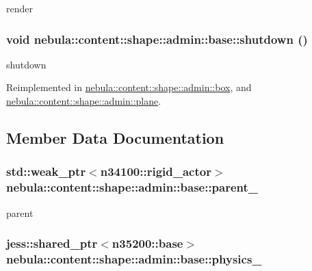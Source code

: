 render \hypertarget{classnebula_1_1content_1_1shape_1_1admin_1_1base_a61d6e9d7853ccf10ddd3d05311729f79}{
\subsubsection[{shutdown}]{\setlength{\rightskip}{0pt plus 5cm}void nebula::content::shape::admin::base::shutdown ()}}
\label{classnebula_1_1content_1_1shape_1_1admin_1_1base_a61d6e9d7853ccf10ddd3d05311729f79}


shutdown 

Reimplemented in \hyperlink{classnebula_1_1content_1_1shape_1_1admin_1_1box_a498fc0508fcdfc64a7e80141f623505d}{nebula::content::shape::admin::box}, and \hyperlink{classnebula_1_1content_1_1shape_1_1admin_1_1plane_ac713ec10355d797e07aabad0c4ebd32b}{nebula::content::shape::admin::plane}.

\subsection{Member Data Documentation}
\hypertarget{classnebula_1_1content_1_1shape_1_1admin_1_1base_a92ffa5c28e9bafe28e7442d6d94bdb04}{
\subsubsection[{parent\_\-}]{\setlength{\rightskip}{0pt plus 5cm}std::weak\_\-ptr$<${\bf n34100::rigid\_\-actor}$>$ {\bf nebula::content::shape::admin::base::parent\_\-}}}
\label{classnebula_1_1content_1_1shape_1_1admin_1_1base_a92ffa5c28e9bafe28e7442d6d94bdb04}


parent \hypertarget{classnebula_1_1content_1_1shape_1_1admin_1_1base_aae0ba5dbb2a6c2750589fe51d3b781a5}{
\subsubsection[{physics\_\-}]{\setlength{\rightskip}{0pt plus 5cm}jess::shared\_\-ptr$<${\bf n35200::base}$>$ {\bf nebula::content::shape::admin::base::physics\_\-}}}
\label{classnebula_1_1content_1_1shape_1_1admin_1_1base_aae0ba5dbb2a6c2750589fe51d3b781a5}


